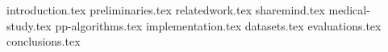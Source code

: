 \documentclass[inscr,ack,dvipsnames]{dithesis}
\begin{document}

\frontmatter

\mainmatter


{introduction.tex}
{preliminaries.tex}
{relatedwork.tex}
{sharemind.tex}
{medical-study.tex}
{pp-algorithms.tex}
{implementation.tex}
{datasets.tex}
{evaluations.tex}
{conclusions.tex}


\backmatter
\end{document}
